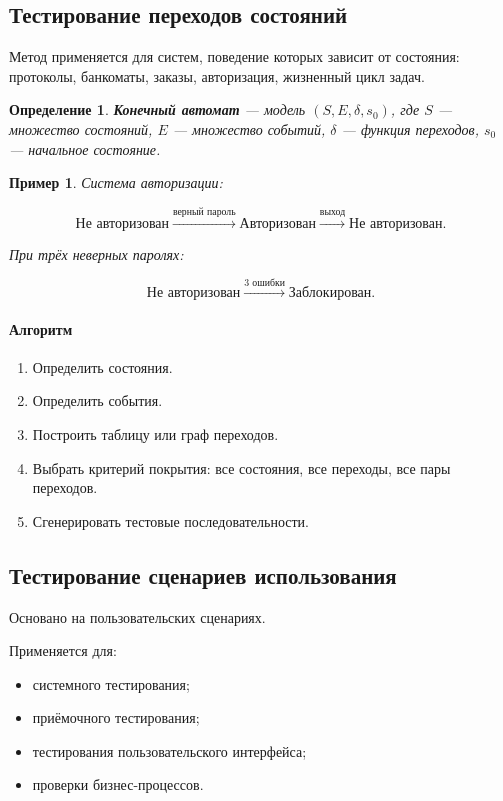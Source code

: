 \documentclass[12pt,a4paper]{article}
\newtheorem{definition}{Определение}
\newtheorem{example}{Пример}
\begin{document}
\subsection{Тестирование переходов состояний}

Метод применяется для систем, поведение которых зависит от состояния: протоколы, банкоматы, заказы, авторизация, жизненный цикл задач.

\begin{definition}
\textbf{Конечный автомат} --- модель $(S, E, \delta, s_0)$, где $S$ --- множество состояний, $E$ --- множество событий, $\delta$ --- функция переходов, $s_0$ --- начальное состояние.
\end{definition}

\begin{example}
Система авторизации:

\[
\text{Не авторизован}
\xrightarrow{\text{верный пароль}}
\text{Авторизован}
\xrightarrow{\text{выход}}
\text{Не авторизован}.
\]

При трёх неверных паролях:

\[
\text{Не авторизован}
\xrightarrow{\text{3 ошибки}}
\text{Заблокирован}.
\]
\end{example}

\paragraph{Алгоритм}

\begin{enumerate}
    \item Определить состояния.
    \item Определить события.
    \item Построить таблицу или граф переходов.
    \item Выбрать критерий покрытия: все состояния, все переходы, все пары переходов.
    \item Сгенерировать тестовые последовательности.
\end{enumerate}

\subsection{Тестирование сценариев использования}

Основано на пользовательских сценариях.

Применяется для:
\begin{itemize}
    \item системного тестирования;
    \item приёмочного тестирования;
    \item тестирования пользовательского интерфейса;
    \item проверки бизнес-процессов.
\end{itemize}
\end{document}

